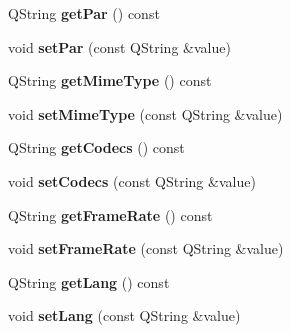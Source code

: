 \begin{DoxyCompactItemize}
\item 
\hypertarget{class_adaptation_set_a8291072d0eab9f204e4d87752debb231}{Q\-String {\bfseries get\-Par} () const }\label{class_adaptation_set_a8291072d0eab9f204e4d87752debb231}

\item 
\hypertarget{class_adaptation_set_a28ca0e4b21b1fceee1e91205061970e8}{void {\bfseries set\-Par} (const Q\-String \&value)}\label{class_adaptation_set_a28ca0e4b21b1fceee1e91205061970e8}

\item 
\hypertarget{class_adaptation_set_a9376140362b7a139bbabc1c834dda869}{Q\-String {\bfseries get\-Mime\-Type} () const }\label{class_adaptation_set_a9376140362b7a139bbabc1c834dda869}

\item 
\hypertarget{class_adaptation_set_afa7be8f5ba4b93d7da1700da9c092b57}{void {\bfseries set\-Mime\-Type} (const Q\-String \&value)}\label{class_adaptation_set_afa7be8f5ba4b93d7da1700da9c092b57}

\item 
\hypertarget{class_adaptation_set_a84d2109beb082510fd6b8b602125fa36}{Q\-String {\bfseries get\-Codecs} () const }\label{class_adaptation_set_a84d2109beb082510fd6b8b602125fa36}

\item 
\hypertarget{class_adaptation_set_ab09d613f80b2c892b3d2f635c124e220}{void {\bfseries set\-Codecs} (const Q\-String \&value)}\label{class_adaptation_set_ab09d613f80b2c892b3d2f635c124e220}

\item 
\hypertarget{class_adaptation_set_a0761da412e013f0bffabdd6340e353d9}{Q\-String {\bfseries get\-Frame\-Rate} () const }\label{class_adaptation_set_a0761da412e013f0bffabdd6340e353d9}

\item 
\hypertarget{class_adaptation_set_a8d44bf7f62a7ee63cbbe3da0dbd398c4}{void {\bfseries set\-Frame\-Rate} (const Q\-String \&value)}\label{class_adaptation_set_a8d44bf7f62a7ee63cbbe3da0dbd398c4}

\item 
\hypertarget{class_adaptation_set_aa92058bedd99969d4390985402986a26}{Q\-String {\bfseries get\-Lang} () const }\label{class_adaptation_set_aa92058bedd99969d4390985402986a26}

\item 
\hypertarget{class_adaptation_set_a28efc20a1fef4f7be67a17feee3a08fc}{void {\bfseries set\-Lang} (const Q\-String \&value)}\label{class_adaptation_set_a28efc20a1fef4f7be67a17feee3a08fc}

\end{DoxyCompactItemize}


